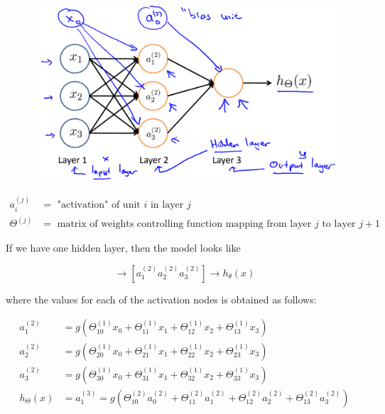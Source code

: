 \documentclass{article}
\begin{document}
        \begin{figure}[hbt!]
            \centering
            \includegraphics[scale=0.5]{Resources/Neural_Net}
        \end{figure}

        \begin{align*}
            a_i^{(j)}       &= \text{ "activation" of unit $i$ in layer $j$} \\
            \Theta^{(j)}    &= \text{ matrix of weights controlling function mapping from layer $j$ to layer
                                $j+1$}
        \end{align*}

        \noindent If we have one hidden layer, then the model looks like

        \begin{equation*}
            [x_0 x_1 x_2 x_3]\to \left[a_1^{(2)} a_2^{(2)} a_3^{(2)}\right] \to h_{\theta}(x)
        \end{equation*}

        \noindent where the values for each of the activation nodes is obtained as follows:

        \begin{align*}
            a_1^{(2)}   &= g(\Theta_{10}^{(1)}x_0 + \Theta_{11}^{(1)}x_1 + \Theta_{12}^{(1)}x_2 +
                           \Theta_{13}^{(1)}x_3) \\
            a_2^{(2)}   &= g(\Theta_{20}^{(1)}x_0 + \Theta_{21}^{(1)}x_1 + \Theta_{22}^{(1)}x_2 +
                           \Theta_{23}^{(1)}x_3) \\
            a_3^{(2)}   &= g(\Theta_{30}^{(1)}x_0 + \Theta_{31}^{(1)}x_1 + \Theta_{32}^{(1)}x_2 +
                           \Theta_{33}^{(1)}x_3) \\
            h_\Theta(x) &= a_1^{(3)} = g(\Theta_{10}^{(2)}a_0^{(2)} + \Theta_{11}^{(2)}a_1^{(2)} +
                           \Theta_{12}^{(2)}a_2^{(2)} + \Theta_{13}^{(2)}a_3^{(2)})
        \end{align*}
\end{document}

